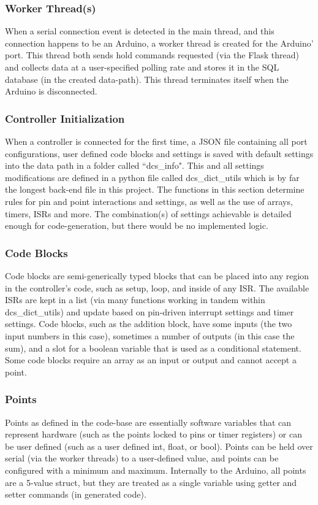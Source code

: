 \documentclass[../main.tex]{subfiles}
\begin{document}
\subsubsection{Worker Thread(s)} When a serial connection event is detected in the main thread, and this connection happens to be an Arduino, a worker thread is created for the Arduino' port. This thread both sends hold commands requested (via the Flask thread) and collects data at a user-specified polling rate and stores it in the SQL database (in the created data-path). This thread terminates itself when the Arduino is disconnected.

\subsubsection{Controller Initialization} When a controller is connected for the first time, a JSON file containing all port configurations, user defined code blocks and settings is saved with default settings into the data path in a folder called ``dcs\_info". This and all settings modifications are defined in a python file called dcs\_dict\_utils which is by far the longest back-end file in this project. The functions in this section determine rules for pin and point interactions and settings, as well as the use of arrays, timers, ISRs and more. The combination(s) of settings achievable is detailed enough for code-generation, but there would be no implemented logic.

\subsubsection{Code Blocks} Code blocks are semi-generically typed blocks that can be placed into any region in the controller's code, such as setup, loop, and inside of any ISR. The available ISRs are kept in a list (via many functions working in tandem within dcs\_dict\_utils) and update based on pin-driven interrupt settings and timer settings. Code blocks, such as the addition block, have some inputs (the two input numbers in this case), sometimes a number of outputs (in this case the sum), and a slot for a boolean variable that is used as a conditional statement. Some code blocks require an array as an input or output and cannot accept a point.

\subsubsection{Points} Points as defined in the code-base are essentially software variables that can represent hardware (such as the points locked to pins or timer registers) or can be user defined (such as a user defined int, float, or bool). Points can be held over serial (via the worker threads) to a user-defined value, and points can be configured with a minimum and maximum. Internally to the Arduino, all points are a 5-value struct, but they are treated as a single variable using getter and setter commands (in generated code).
\end{document}
